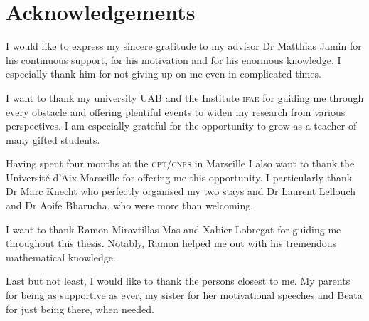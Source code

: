 \documentclass[../../index.tex]{subfiles}
\begin{document}
\chapter*{Acknowledgements}
I would like to express my sincere gratitude to my advisor Dr Matthias Jamin
for his continuous support, for his motivation and for his enormous knowledge. I
especially thank him for not giving up on me even in complicated times.

I want to thank my university \textsc{UAB} and the Institute \textsc{ifae} for
guiding me through every obstacle and offering plentiful events to widen my
research from various perspectives. I am especially grateful for the opportunity
to grow as a teacher of many gifted students.

Having spent four months at the \textsc{cpt}/\textsc{cnrs} in Marseille I also
want to thank the Université d'Aix-Marseille for offering me this opportunity. I
particularly thank Dr Marc Knecht who perfectly organised my two stays and Dr
Laurent Lellouch and Dr Aoife Bharucha, who were more than welcoming.

I want to thank Ramon Miravtillas Mas and Xabier Lobregat for guiding me
throughout this thesis. Notably, Ramon helped me out with his tremendous
mathematical knowledge.

Last but not least, I would like to thank the persons closest to me. My parents
for being as supportive as ever, my sister for her motivational speeches and
Beata for just being there, when needed.
\end{document}

